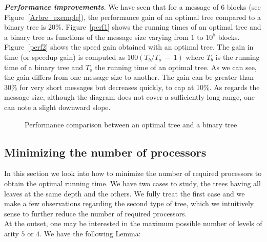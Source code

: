 \documentclass{llncs}
\renewcommand{\paragraph}[1]{\noindent\textit{#1}.}
\begin{document}
\paragraph{\textbf{Performance improvements}}
We have seen that for a message of 6 blocks (see Figure~\ref{Arbre_exemple}), the performance gain of an optimal tree compared to a binary tree is 20\%.
Figure~\ref{perf1} shows the running times of an optimal tree and a binary tree as functions of the message size varying from $1$ to $10^5$ blocks. 
Figure~\ref{perf2} shows the speed gain obtained with an optimal tree. 
The gain in time (or speedup gain) 
is computed as $100(T_b/T_o~-~1)$ where $T_b$ is the running time of a binary tree and $T_o$ the running time of an optimal tree. 
As we can see, the gain differs from one message size to another. The gain can be greater than 30\% for very short messages
but decreases quickly, to cap at 10\%. 
As regards the message size, although the diagram
does not cover a sufficiently long range, one can note a slight downward slope. 
\begin{figure}[htb]
\centering
{}


\caption{Performance comparison between an optimal tree and a binary tree}
\label{Gains_execution}
\end{figure}

\subsection{Minimizing the number of processors}\label{subsec:proce}

In this section we look into how to minimize the number of required processors to obtain the optimal running time.
We have two cases to study, the trees having all leaves at the same depth and the others. 
We fully treat the first case and we make a few observations regarding the second type of tree, 
which we intuitively sense to further reduce the number of required processors.~\\

At the outset, one may be interested in the maximum possible number of levels of arity $5$ or $4$. We have the following Lemma:
\end{document}

